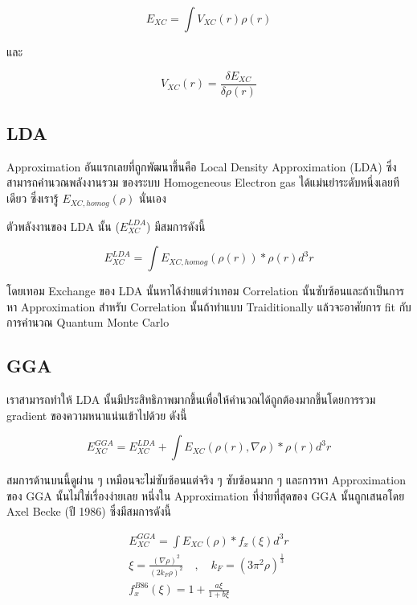 \begin{equation}
    E_{XC} = \int V_{X C}(r) \rho(r)
\end{equation}

\noindent และ

\begin{equation}
    V_{X C}(r) = \frac{\delta E_{X C}}{\delta \rho(r)}
\end{equation}

\subsection{LDA}

Approximation อันแรกเลยที่ถูกพัฒนาขึ้นคือ Local Density Approximation (LDA) ซึ่งสามารถคำนวณพลังงานรวม%
ของระบบ Homogeneous Electron gas ได้แม่นยำระดับหนึ่งเลยทีเดียว ซึ่งเรารู้ $E_{XC, homog}(\rho)$
นั่นเอง

ตัวพลังงานของ LDA นั้น ($E^{LDA}_{XC}$) มีสมการดังนี้

\begin{equation}
    E^{LDA}_{XC} = \int E_{XC,homog} (\rho(r)) * \rho(r)d^{3}r
\end{equation}

โดยเทอม Exchange ของ LDA นั้นหาได้ง่ายแต่ว่าเทอม Correlation นั้นซับซ้อนและถ้าเป็นการหา Approximation
สำหรับ Correlation นั้นถ้าทำแบบ Traiditionally แล้วจะอาศัยการ fit กับการคำนวณ Quantum Monte Carlo

\subsection{GGA}

เราสามารถทำให้ LDA นั้นมีประสิทธิภาพมากขึ้นเพื่อให้คำนวณได้ถูกต้องมากขึ้นโดยการรวม gradient ของความหนาแน่นเข้าไปด้วย
ดังนี้

\begin{equation}
    E^{GGA}_{XC} = E^{LDA}_{XC} + \int E_{XC} (\rho(r), \nabla\rho) * \rho(r)d^{3}r
\end{equation}

สมการด้านบนนี้ดูผ่าน ๆ เหมือนจะไม่ซับซ้อนแต่จริง ๆ ซับซ้อนมาก ๆ และการหา Approximation ของ GGA
นั้นไม่ใช่เรื่องง่ายเลย หนึ่งใน Approximation ที่ง่ายที่สุดของ GGA นั้นถูกเสนอโดย Axel Becke (ปี 1986)
ซึ่งมีสมการดังนี้

\begin{gather}
    E^{GGA}_{XC} = \int E_{XC} (\rho) * f_{x}(\xi) d^{3}r \\
    \xi = \frac{(\nabla \rho)^{2}}{(2 k_{F} \rho)^{2}}
    \quad , \quad k_{F} = (3\pi^{2}\rho)^{\frac{1}{3}} \\
    f^{B86}_{x}(\xi) = 1 + \frac{a\xi}{1 + b\xi}
\end{gather}

